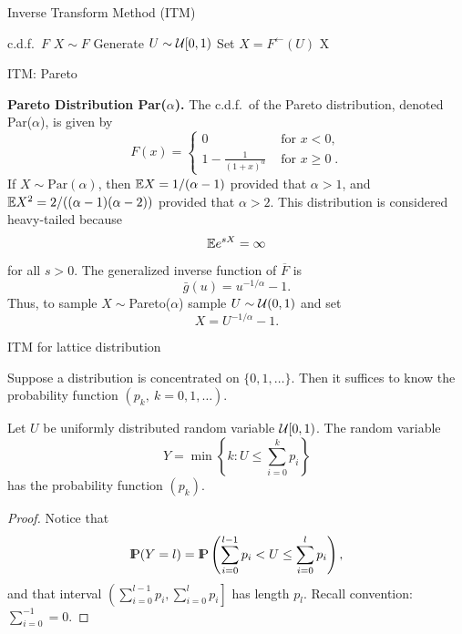 \documentclass[aspectratio=169]{beamer}
\newcommand{\Prob}{{\rm I\hspace{-0.8mm}P}}
\begin{document}
\begin{frame}{Inverse Transform Method (ITM)}

\begin{algorithm}[H]
\caption{ITM; generating $X\sim F$}
\label{alg:genX}
\begin{algorithmic}[1]
\Require c.d.f.\ $F$
\Ensure $X\sim F$
\State Generate $U\sim{\cal U}[0,1)$
\State Set $X= F^{\leftarrow}(U)$
\State \Return X
\end{algorithmic}
\end{algorithm}

\end{frame}




\begin{frame}{ITM: Pareto }

\textbf{Pareto Distribution Par($\alpha$).}
The  c.d.f.\ of the Pareto distribution, denoted Par(\(\alpha\)), is given by
\begin{equation}\label{e.r.par}
F(x)=\left\{
\begin{array}{ll}
0& \textrm{\ for }   x<0,\\[5pt]
\displaystyle 1-\frac{1}{ (1+x)^\alpha} & \textrm{\ for }   x\ge 0\;.
\end{array}
\right.
\end{equation}
If \( X \sim \mbox{Par}(\alpha) \), then \( \mathbb{E} X = 1/(\alpha - 1) \) provided that \( \alpha > 1 \), and \( \Exp X^2 =\linebreak
 2/((\alpha - 1)(\alpha - 2)) \) provided that \( \alpha > 2 \). This distribution is considered heavy-tailed because
$$\mathbb{E} e^{sX} = \infty$$
for all \( s > 0 \).
The generalized inverse function of \( \overline{F} \) is
$$\bar{g}(u) = u^{-1/\alpha} - 1.$$
\pause
Thus, to sample $X\sim$Pareto($\alpha$) sample $U\sim{\cal U}(0,1)$ and set
$$X=U^{-1/\alpha} - 1.$$
\end{frame}




\begin{frame}{ITM for lattice distribution}

Suppose a distribution is concentrated on
$\{0,1,\ldots\}$. Then it suffices to know the probability function $(p_k,\ k=0,1,\ldots)$.

\begin{myProp}\label{p.ITM-d} Let $U$ be uniformly  distributed random variable ${\cal U}[0,1)$.
The random variable
$$Y=\min\left\{k: U\le \sum_{i=0}^kp_i\right\}$$
has the probability function  $(p_k)$.
\end{myProp}
\pause
\begin{proof}
Notice that
$$\Prob(Y=l)=\Prob\left(\sum_{i=0}^{l-1}p_i<U\le \sum_{i=0}^lp_i \right),$$
and that interval  $\left(\sum_{i=0}^{l-1}p_i,\sum_{i=0}^lp_i\right]$ has length $p_l$.
  Recall   convention:
  $\sum_{i=0}^{-1}=0$.
\end{proof}
\end{frame}
\end{document}
